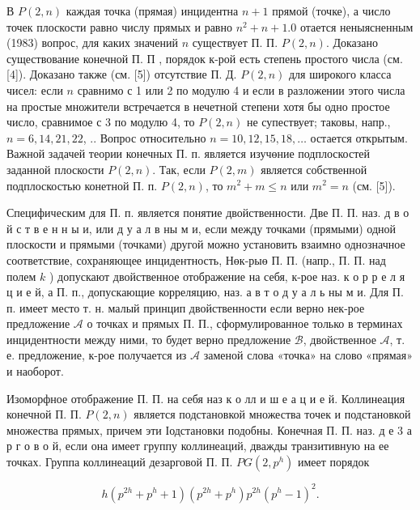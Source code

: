 \documentclass[10pt]{article}
\begin{document}
В $P(2, n)$ каждая точка (прямая) инцидентна $n+1$ прямой (точке), а число точек плоскости равно числу прямых и равно $n^{2}+n+1.0$ отается неныясненным (1983) вопрос, для каких значений $n$ существует П. П. $P(2, n)$. Доказано существование конечной П. П , порядок к-рой есть степень простого числа (см. [4]). Доказано также (см. [5]) отсутствие П. Д. $P(2, n)$ для широкого класса чисел: если $n$ сравнимо с 1 или 2 по модулю 4 и если в разложении этого числа на простые множители встречается в нечетной степени хотя бы одно простое число, сравнимое с 3 по модулю 4, то $P(2, n)$ не супествует; таковы, напр., $n=6,14,21,22$, .. Вопрос относительно $n=10,12,15,18, \ldots$ остается открытым. Важной задачей теории конечных П. п. является изучөние подплоскостей заданной плоскости $P(2, n)$. Так, если $P(2, m)$ является собственной подплоскостью конетной П. п. $P(2, n)$, то $m^{2}+m \leqslant n$ или $m^{2}=n$ (см. [5]).



Специфическим для П. п. является понятие двойственности. Две П. П. наз. д в о й с т в е н н ы и, или д у а л в ны м и, если между точками (прямыми) одной плоскости и прямыми (точками) другой можно установить взаимно однозначное соответствие, сохраняющее инцидентность, Нөк-рыө П. П. (напр., П. П. над полем $k$ ) допускают двойственное отображение на себя, к-рое наз. к о р р е л я ц и е й, а П. п., допускающие корреляцию, наз. а в т о д у а л ь ны м и. Для П. п. имеет место т. н. малый принцип двойственности если верно нек-рое предложение $\mathcal{A}$ о точках и прямых П. П., сформулированное только в терминах инцидентности между ними, то будет верно предложение $\mathscr{B}$, двойственное $\mathscr{A}$, т. е. предложение, к-рое получается из $\mathcal{A}$ заменой слова «точка» на слово «прямая» и наоборот.



Изоморфное отображение П. П. на себя наз к о лл и ш е а ц и е й. Коллинеация конечной П. П. $P(2, n)$ является подстановкой множества точек и подстановкой множества прямых, причем эти Іодстановки подобны. Конечная П. П. наз. д е 3 а р г о в о й, если она имеет группу коллинеаций, дважды транзитивную на ее точках. Группа коллинеаций дезарговой П. П. $P G\left(2, p^{h}\right)$ имеет порядок



\[

h\left(p^{2 h}+p^{h}+1\right)\left(p^{2 h}+p^{h}\right) p^{2 h}\left(p^{h}-1\right)^{2} .

\]
\end{document}

